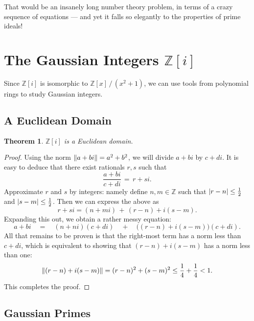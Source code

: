 \documentclass[11pt]{article}
\newtheorem{theorem}{Theorem}
\begin{document}
That would be an insanely long number theory problem, in terms of a crazy sequence of equations --- and yet it falls so elegantly to the properties of prime ideals!


\section{The Gaussian Integers \texorpdfstring{$\mathbb{Z}[i]$}{Z[i]}}

Since $\mathbb{Z}[i]$ is isomorphic to $\mathbb{Z}[x] \, / \, (x^{2} + 1)$, we can use tools from polynomial rings to study Gaussian integers.


\subsection{A Euclidean Domain}

\begin{adjustwidth}{0.5cm}{}
  \begin{theorem}
    $\mathbb{Z}[i]$ is a Euclidean domain.
  \end{theorem}
  \begin{proof}
    Using the norm $\norm{a + bi} = a^{2} + b^{2}$, we will divide $a + bi$ by $c + di$. It is easy to deduce that there exist rationals $r, s$ such that
    \[
      \frac{a + bi}{c + di} \, = \, r + si.
    \]
    Approximate $r$ and $s$ by integers: namely define $n, m 
    \in \mathbb{Z}$ such that $\abs{r - n} \le \tfrac{1}{2}$ and $\abs{s - m} \le \tfrac{1}{2}$. Then we can express the above as
    \[
      r + si  = (n + mi ) \, + \, (r - n) + i(s - m).
    \]
    Expanding this out, we obtain a rather messy equation:
    \[
      a + bi \quad = \quad (n + ni )(c + di ) \quad + \quad \big( (r - n) + i(s - m)  \big)(c + di ).
    \]
    All that remains to be proven is that the right-most term has a norm less than $c + di$, which is equivalent to showing that $(r - n) + i (s - m) $ has a norm less than one:
    \[
      \norm{(r - n) + i(s - m) } = (r - n)^{2} + (s - m)^{2} \le \frac{1}{4} + \frac{1}{4} < 1.
    \]
    This completes the proof.
  \end{proof}
\end{adjustwidth}

\subsection{Gaussian Primes}
\end{document}
